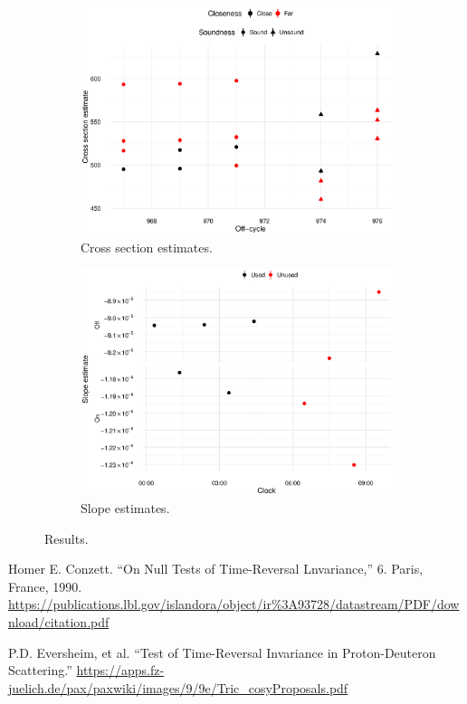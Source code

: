 \documentclass[reprint]{revtex4-1}
\newcommand{\scl}{.39}
\begin{document}
\begin{figure}
\begin{subfigure}{.5\textwidth}
\includegraphics[scale=\scl]{img/Cross-Section_all.eps}
\caption{Cross section estimates.\label{fig:CS-all}}
\end{subfigure}
\begin{subfigure}{.5\textwidth}
\includegraphics[scale=\scl]{img/Slopes-2012_big.eps}
\caption{Slope estimates.\label{fig:Slopes}}
\end{subfigure}
\caption{Results.}
\end{figure}


\begin{thebibliography}{9}
Homer E. Conzett. “On Null Tests of Time-Reversal Lnvariance,” 6. Paris, France, 1990. \url{https://publications.lbl.gov/islandora/object/ir%3A93728/datastream/PDF/download/citation.pdf}

P.D. Eversheim, et al. ``Test of Time-Reversal Invariance in Proton-Deuteron Scattering.''
\url{https://apps.fz-juelich.de/pax/paxwiki/images/9/9e/Tric_cosyProposals.pdf}

\end{thebibliography}
\end{document}
